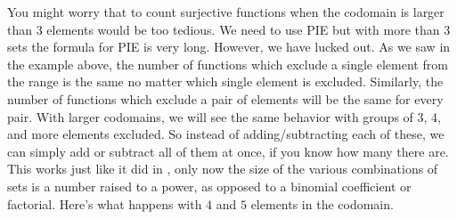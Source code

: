 \documentclass[12pt]{article}
\begin{document}
You might worry that to count surjective functions when the codomain is larger than 3 elements would be too tedious.  We need to use PIE but with more than 3 sets the formula for PIE is very long.  However, we have lucked out.  As we saw in the example above, the number of functions which exclude a single element from the range is the same no matter which single element is excluded.  Similarly, the number of functions which exclude a pair of elements will be the same for every pair.  With larger codomains, we will see the same behavior with groups of 3, 4, and more elements excluded.  So instead of adding/subtracting each of these, we can simply add or subtract all of them at once, if you know how many there are.  This works just like it did in , only now the size of the various combinations of sets is a number raised to a power, as opposed to a binomial coefficient or factorial.  Here's what happens with $4$ and $5$ elements in the codomain.
\end{document}
